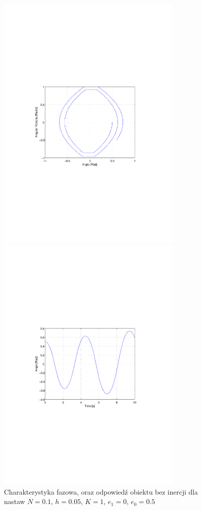 \documentclass[12pt]{article}
\begin{document}
\newpage

\begin{figure}[!htb]
	\begin{center}
		\includegraphics[trim=5cm 9cm 5cm
		9cm,width=9cm]{../res/img/s1_T0_N0,1_h0,05_K1_e1-0_e0-0,5p.pdf}
	\end{center}
	
	\begin{center}
		\includegraphics[trim=5cm 9cm 5cm
		9cm,width=9cm]{../res/img/s1_T0_N0,1_h0,05_K1_e1-0_e0-0,5r.pdf}
	\end{center}
	\caption{Charakterystyka fazowa, oraz odpowiedź obiektu bez inercji dla
	nastaw $N=0.1$, $h=0.05$, $K=1$, $e_1=0$, $e_0=0.5$}
\end{figure}
\end{document}
